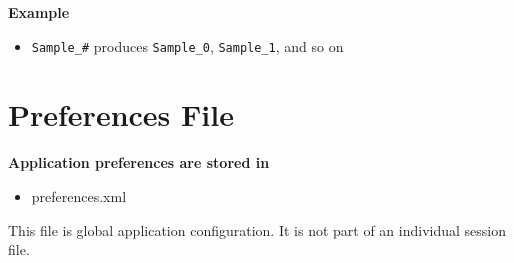 \documentclass[
  9pt,
  letterpaper,
  oneside,
  open=any,
  DIV=15,
  parskip=half-,
  headings=big,
  numbers=noenddot
]{scrbook}
\newcommand{\manuallead}[1]{%
  \vspace{0.15em}%
  {\sffamily\bfseries\color{ManualBlue}#1}\par\nobreak\vspace{0.05em}%
}
\begin{document}
\manuallead{Example}

\begin{itemize}[leftmargin=*,itemsep=0.35em,topsep=0.4em]
\item \texttt{Sample\_\#} produces \texttt{Sample\_0}, \texttt{Sample\_1}, and so on
\end{itemize}

\section{Preferences File}

\manuallead{Application preferences are stored in}

\begin{itemize}[leftmargin=*,itemsep=0.35em,topsep=0.4em]
\item preferences.xml
\end{itemize}

This file is global application configuration. It is not part of an individual session file.
\end{document}
